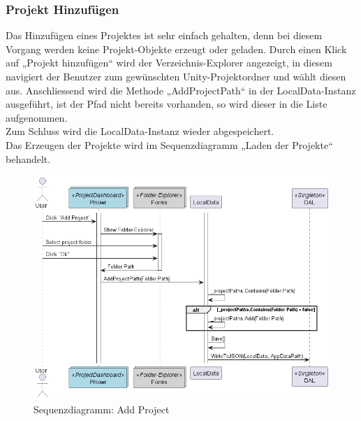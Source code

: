 \subsubsection{Projekt Hinzufügen}
Das Hinzufügen eines Projektes ist sehr einfach gehalten, denn bei diesem Vorgang werden keine Projekt-Objekte erzeugt oder geladen.
Durch einen Klick auf „Projekt hinzufügen“ wird der Verzeichnis-Explorer angezeigt, in diesem navigiert der Benutzer zum gewünschten Unity-Projektordner
und wählt diesen aus. Anschliessend wird die Methode „AddProjectPath“ in der LocalData-Instanz ausgeführt, ist der Pfad nicht bereits vorhanden, so wird dieser in die Liste aufgenommen.\\
Zum Schluss wird die LocalData-Instanz wieder abgespeichert.\\
Das Erzeugen der Projekte wird im Sequenzdiagramm „Laden der Projekte“ behandelt.
\begin{figure}[H]
  \begin{center}
    \includegraphics[width=0.7\linewidth]{../content/diagrams/sequence/addProjectSequence/addProjectSequence.png}
    \caption{Sequenzdiagramm: Add Project}
  \end{center}
\end{figure}
\newpage

